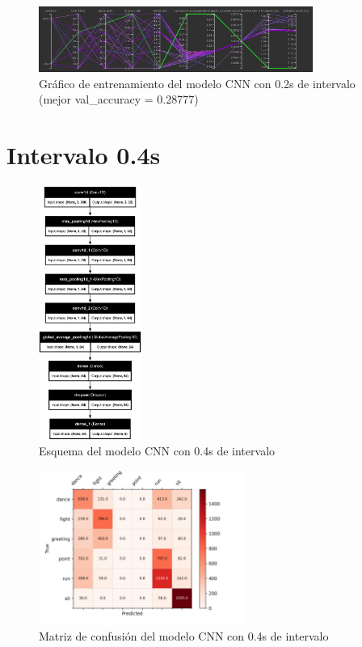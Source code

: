 \begin{figure}[H]
    \centering
    \includegraphics[width=0.8\textwidth]{Imagenes/Bitmap/tb-cnn-0.2.png}
    \caption{Gráfico de entrenamiento del modelo CNN con 0.2s de intervalo (mejor val\_accuracy = 0.28777)}
    \label{fig:cnn-0.2-grafico}
\end{figure}

\section{Intervalo 0.4s}

\begin{figure}[H]
    \centering
    \includegraphics[width=0.3\textwidth]{Imagenes/Bitmap/best-cnn0.4.png}
    \caption{Esquema del modelo CNN con 0.4s de intervalo}
    \label{fig:cnn-0.4-final}
\end{figure}
\begin{figure}[H]
    \centering
    \includegraphics[width=0.6\textwidth]{Imagenes/Bitmap/CM_best-cnn0.4.png}
    \caption{Matriz de confusión del modelo CNN con 0.4s de intervalo}
    \label{fig:cnn-0.4-matriz}
\end{figure}

